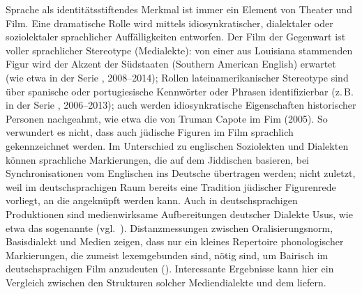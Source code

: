 Sprache als identitätsstiftendes Merkmal ist immer ein Element von Theater und Film. Eine dramatische Rolle wird mittels idiosynkratischer, dialektaler oder soziolektaler sprachlicher Auffälligkeiten entworfen. Der Film der Gegenwart ist voller sprachlicher Stereotype (Medialekte): von einer aus Louisiana stammenden Figur wird der Akzent der Südstaaten (Southern American English) erwartet (wie etwa in der Serie , 2008--2014); Rollen lateinamerikanischer Stereotype sind über spanische oder portugiesische Kennwörter oder Phrasen identifizierbar (z.\,B.\, in der Serie , 2006--2013); auch werden idiosynkratische Eigenschaften historischer Personen nachgeahmt, wie etwa die von Truman Capote im Fim  (2005). So verwundert es nicht, dass auch jüdische Figuren im Film sprachlich gekennzeichnet werden. Im Unterschied zu englischen Soziolekten und Dialekten können sprachliche Markierungen, die auf dem Jiddischen basieren, bei Synchronisationen vom Englischen ins Deutsche übertragen werden; nicht zuletzt, weil im deutschsprachigen Raum bereits eine Tradition jüdischer Figurenrede vorliegt, an die angeknüpft werden kann. Auch in deutschsprachigen Produktionen sind medienwirksame Aufbereitungen deutscher Dialekte Usus, wie etwa das sogenannte  (vgl.\, \citealt{Kleiner2013,Riemann2009,MayerZimmerer2009}). Distanzmessungen zwischen Oralisierungsnorm, Basisdialekt und Medien zeigen, dass nur ein kleines Repertoire phonologischer Markierungen, die zumeist lexemgebunden sind, nötig sind, um Bairisch im deutschsprachigen Film anzudeuten (\citealt{Kleiner2013,Riemann2009,MayerZimmerer2009}). Interessante Ergebnisse kann hier ein Vergleich zwischen den Strukturen solcher Mediendialekte und dem  liefern.

